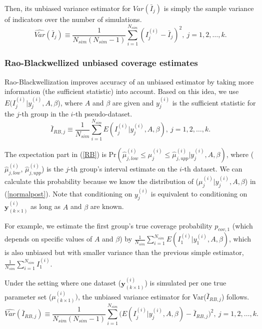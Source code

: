 \documentclass[article]{jss}
\begin{document}
Then, its unbiased variance estimator  for $Var(\bar{I}_{j})$ is simply the sample variance of indicators over the number of simulations.
\begin{equation}\label{svar}
\widehat{Var}(\bar{I}_{j})\equiv\frac{1}{N_{sim}(N_{sim}-1)}\sum_{i=1}^{N_{sim}}(I^{(i)}_{j}-\bar{I}_{j})^{2},~ j=1, 2, \ldots, k.
\end{equation}


\subsubsection{Rao-Blackwellized unbiased coverage estimates}
Rao-Blackwellization improves accuracy of an unbiased estimator by taking more information (the sufficient statistic) into account. Based on this idea, we use $E(I^{(i)}_{j}\vert y^{(i)}_{j}, A, \beta$), where $A$ and $\beta$ are given and $y^{(i)}_{j}$ is the sufficient statistic for the $j$-th group in the $i$-th pseudo-dataset. 
\begin{equation}\label{RB}
\bar{I}_{RB, j}\equiv \frac{1}{N_{sim}}\sum_{i=1}^{N_{sim}}E(I^{(i)}_{j}\vert y^{(i)}_{j}, A, \beta),~ j=1, 2, \ldots, k.
\end{equation}

The expectation part in (\ref{RB}) is Pr$(\hat{\mu}^{(i)}_{j, low}\le \mu^{(i)}_{j} \le\hat{\mu}^{(i)}_{j, upp}\vert y^{(i)}_{j}, A, \beta)$, where ($\hat{\mu}^{(i)}_{j, low}$, $\hat{\mu}^{(i)}_{j, upp}$) is the $j$-th group's interval estimate on the $i$-th dataset. We can calculate this probability  because we know the distribution of ($\mu^{(i)}_{j} \vert y^{(i)}_{j}, A, \beta$) in (\ref{normalpost}). Note that conditioning on $y^{(i)}_{j}$ is equivalent to conditioning on $\mathbf{y}^{(i)}_{(k\times1)}$ as long as $A$ and $\beta$ are known. 

For example, we estimate the first group's true coverage probability $p_{cov, 1}$ (which depends on specific values of $A$ and $\beta$) by $\frac{1}{N_{sim}}\sum_{i=1}^{N_{sim}}E(I^{(i)}_{1}\vert y^{(i)}_{1}, A, \beta)$, which is also unbiased but with smaller variance than the previous simple estimator, $\frac{1}{N_{sim}}\sum_{i=1}^{N_{sim}}I^{(i)}_{1}$.

Under the setting where one dataset ($\mathbf{y}^{(i)}_{(k\times1)}$) is simulated per one true parameter set ({\boldmath $\mu$}$^{(i)}_{(k\times1)})$, the unbiased variance estimator for Var($\bar{I}_{RB, j}$) follows.
\begin{equation}\label{RBvar}
\widehat{Var}(\bar{I}_{RB, j})\equiv\frac{1}{N_{sim}(N_{sim}-1)}\sum_{i=1}^{N_{sim}}\bigg(E(I^{(i)}_{j}\vert y^{(i)}_{j}, A, \beta)-\bar{I}_{RB, j}\bigg)^{2},~ j=1, 2, \ldots, k.
\end{equation}
\end{document}
